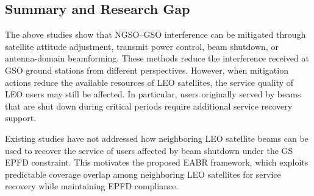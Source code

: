 \subsection{Summary and Research Gap}
\label{subsec:research_gap}

The above studies show that NGSO--GSO interference can be mitigated through satellite attitude adjustment, transmit power control, beam shutdown, or antenna-domain beamforming. These methods reduce the interference received at GSO ground stations from different perspectives. However, when mitigation actions reduce the available resources of LEO satellites, the service quality of LEO users may still be affected. In particular, users originally served by beams that are shut down during critical periods require additional service recovery support.

Existing studies have not addressed how neighboring LEO satellite beams can be used to recover the service of users affected by beam shutdown under the GS EPFD constraint. This motivates the proposed EABR framework, which exploits predictable coverage overlap among neighboring LEO satellites for service recovery while maintaining EPFD compliance.
